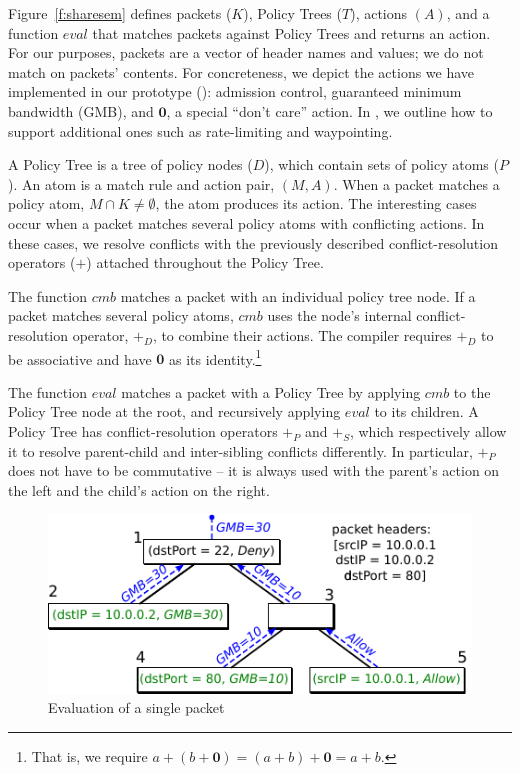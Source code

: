 Figure~\ref{f:sharesem} defines packets ($K$), Policy Trees ($T$),
actions $(A)$, and a function $\mathit{eval}$ that matches packets
against Policy Trees and returns an action. 
For our purposes, packets are 
a vector of header names and values; we do not match on packets'
contents. {\color{red} For concreteness, we depict the actions we have implemented in 
our prototype (): admission control, guaranteed
minimum bandwidth (GMB), and $\textbf{0}$, a special ``don't care''
action. In
, we outline how to support additional ones such as
rate-limiting and waypointing.}

A Policy Tree is a tree of policy nodes ($D$), which contain sets of policy
atoms ($P$). An atom is a match rule and action pair, $(M,A)$. When a
packet matches a policy atom, $M \cap K \ne \emptyset$, the atom produces
its action. The interesting cases occur when a packet matches several
policy atoms with conflicting actions. In these cases, we resolve conflicts
with the previously described conflict-resolution operators ($+$) attached throughout the Policy Tree.

The function $\mathit{cmb}$ matches a packet with an individual policy
tree node. If a packet matches several policy atoms,
$\mathit{cmb}$ uses the node's internal conflict-resolution operator, $+_D$,
to combine their actions. The compiler
requires $+_D$ to be associative and have $\textbf{0}$
as its identity.\footnote{That is, we require $a + (b +  \textbf{0}) =
(a + b) + \textbf{0} = a + b$.}

The function $\mathit{eval}$ matches a packet with a Policy Tree by
applying $\mathit{cmb}$ to the Policy Tree node at the root, and
recursively applying $\mathit{eval}$ to its children. A Policy Tree
has conflict-resolution operators $+_P$ and $+_S$, which respectively allow
it to resolve parent-child and inter-sibling conflicts differently. In
particular, $+_P$ does not have to be commutative -- it is always used
with the parent's action on the left and the child's action on the
right.


\begin{figure}
\centering
\includegraphics{figs/evaltree}
\caption{Evaluation of a single packet}
\label{f:evaltree}
\end{figure}


